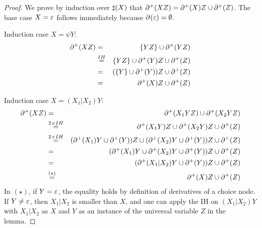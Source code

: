 \begin{proof}
  \iffalse
  We first prove that if $X=S{\diamond}$ then $\CDp{X}=\CDp{S}X$.
  In order to do so, we let $\CDp[1]{X}\eqdef \CD{}{X}$ and
  $\CDp[n+1]{X} \eqdef \CD{}{X} \cup \CDp[n]{\CD{}{X}}$ where, for a set $L$ of normalized regexes,
  $\CDp[n]{L} \eqdef \bigcup_{X\in L}\CDp[n]{X}$. We prove by induction over $n$ that for all $S$
  \[
  \CDp[n]{S{\diamond}} = \CDp[n]{S}S{\diamond}
  \]
  The base case $n=1$ follows directly from the definition of $\CD{\alpha}{S{\diamond}}$ (for any $\alpha$).
  For the induction case, $n+1$, we get, by using the definition of $\CD{\alpha}{S{\diamond}}$ (for any $\alpha$),
  \[
  \CDp[n+1]{S{\diamond}} = \CD{}{S{\diamond}} \cup \CDp[n]{\CD{}{S{\diamond}}} =
  \CD{}{S}S{\diamond} \cup \CDp[n]{\CD{}{S}S{\diamond}} \stackrel{\textrm{IH}}{=}
   \CD{}{S}S{\diamond} \cup \CDp[n]{S}{\CD{}{S{\diamond}}}
  \]
  It follows that
  \[
  \CDp{X} = \bigcup_{n\geq 1}\CDp[n]{X} = \bigcup_{n\geq 1}\CDp[n]{S}X = (\bigcup_{n\geq 1}\CDp[n]{S})X = \CDp{S}X
  \]
  \fi
  We prove 
  by induction over $\sharp(X)$ that $\partial^{+}(XZ)=\partial^{+}(X)Z\cup\partial^{+}(Z)$.
  The base case $X=\varepsilon$ follows immediately because
  $\partial_{}^{{}}(\varepsilon)=\emptyset$.
  
  Induction case $X=\psi Y$:
  \begin{eqnarray*}
    \partial^{+}(XZ) &=& \{Y Z\} \cup \partial^{+}(YZ) \\
    &\stackrel{IH}{=}&
    \{Y Z\} \cup \partial^{+}(Y)Z \cup\partial^{+}(Z) \\
    &=& (\{Y\} \cup \partial^{+}(Y))Z \cup \partial^{+}(Z) \\
    &=& \partial^{+}(X)Z\cup\partial^{+}(Z)
  \end{eqnarray*}

  Induction case $X=(X_1|X_2)Y$:
  \begin{eqnarray*}
    \partial^{+}(XZ) &=& \partial^{+}(X_1YZ)\cup\partial^{+}(X_2YZ)\\
    &\stackrel{2\times IH}{=}&
    \partial^{+}(X_1Y)Z \cup \partial^{+}(X_2Y)Z \cup\partial^{+}(Z) \\
    &\stackrel{2\times IH}{=}&
    (\partial^{+}(X_1)Y\cup \partial^{+}(Y))Z \cup (\partial^{+}(X_2)Y\cup \partial^{+}(Y))Z \cup\partial^{+}(Z) \\
    &=&
    (\partial^{+}(X_1)Y \cup \partial^{+}(X_2)Y \cup \partial^{+}(Y))Z \cup\partial^{+}(Z) \\
    &=&
    (\partial^{+}(X_1|X_2)Y \cup \partial^{+}(Y))Z \cup\partial^{+}(Z) \\
     &\stackrel{(\star)}{=}&
    \partial^{+}(X)Z \cup\partial^{+}(Z) 
  \end{eqnarray*}
  In $(\star)$, if $Y=\varepsilon$, the equality holds by definition of
  derivatives of a choice node.  
  If $Y\neq \varepsilon$, then $X_1|X_2$ is
  smaller than $X$, and one can apply the IH on $(X_1|X_2)Y$ with $X_1|X_2$ as $X$ and 
  $Y$ as an instance of the universal variable $Z$ in the lemma.


\end{proof}
